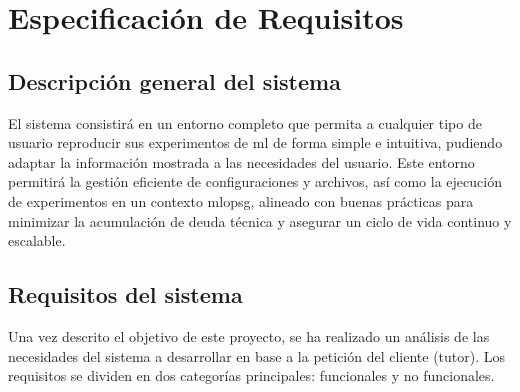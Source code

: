 \chapter{Especificación de Requisitos}

\section{Descripción general del sistema}
El sistema consistirá en un entorno completo que permita a cualquier tipo de usuario reproducir sus experimentos de \Gls{ml} de forma simple e intuitiva, pudiendo adaptar la información mostrada a las necesidades del usuario. Este entorno permitirá la gestión eficiente de configuraciones y archivos, así como la ejecución de experimentos en un contexto \Gls{mlopsg}, alineado con buenas prácticas para minimizar la acumulación de deuda técnica y asegurar un ciclo de vida continuo y escalable.

\section{Requisitos del sistema}
Una vez descrito el objetivo de este proyecto, se ha realizado un análisis de las necesidades del sistema a desarrollar en base a la petición del cliente (tutor). Los requisitos se dividen en dos categorías principales: funcionales y no funcionales.

